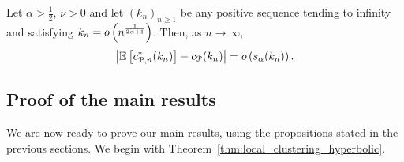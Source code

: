 \begin{proposition}\label{prop:convergence_average_clustering_P_n}
Let $\alpha > \frac{1}{2}$, $\nu > 0$ and let $(k_n)_{n \ge 1}$ be any positive sequence tending to infinity and satisfying $k_n = o\left(n^{\frac{1}{2\alpha+1}}\right)$. Then, as $n \to \infty$,
\[
	\left|\mathbb{E}\left[c_{{\mathcal P},n}^\ast(k_n)\right] - c_{{\mathcal P}}(k_n)\right| = o\left(s_\alpha(k_n)\right).
\]
\end{proposition}

\subsection{Proof of the main results}\label{ssec:proof_main_results}

We are now ready to prove our main results, using the propositions stated in the previous sections. We begin with Theorem~\ref{thm:local_clustering_hyperbolic}.

